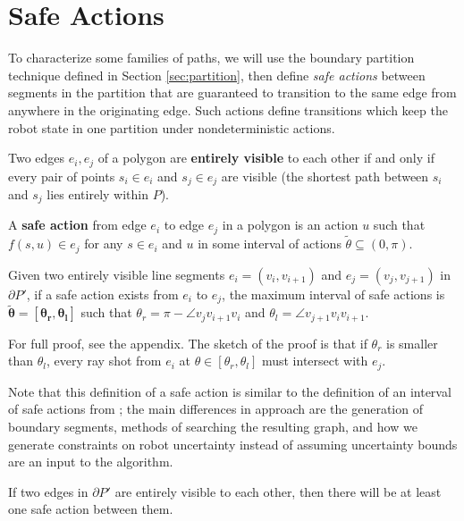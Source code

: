 \documentclass[]{styles/svproc}  %
\begin{document}
\section{Safe Actions} \label{sec:safe}

To characterize some families of paths, we will use the boundary
partition technique defined in Section \ref{sec:partition}, then define
\emph{safe actions} between segments in the partition that are
guaranteed to transition to the same edge from anywhere in the
originating edge. Such actions define transitions which keep the
robot state in one partition under nondeterministic actions.

\begin{definition}
Two edges $e_i,e_j$ of a polygon are \textbf{entirely visible} to each other if
and only if every pair of points $s_i \in e_i$ and $s_j \in e_j$ are visible (the
shortest path between $s_i$ and $s_j$ lies entirely within $P$).
\end{definition}

\begin{definition} \label{def:sa}
A \textbf{safe action} from edge $e_i$ to edge $e_j$ in a polygon is an 
action $u$ such
that $f(s,u) \in e_j$ for any $s \in e_i$ and $u$ in some interval of actions
$\tilde{\theta} \subseteq (0,\pi)$.
\end{definition}

\begin{proposition} \label{prop:saferange}
Given two entirely visible line segments $e_i = (v_i, v_{i+1})$ and $e_j =
(v_j, v_{j+1})$ in $\partial P'$, if a safe action
exists from $e_i$ to $e_j$, the maximum interval of safe actions is $\bm{\tilde{\theta} = [\theta_r, \theta_l]}$ such
that $\theta_r = \pi - \angle v_j v_{i+1} v_i$ and $\theta_l = \angle v_{j+1}
v_i v_{i+1}$.
\end{proposition}

For full proof, see the appendix. The sketch of the proof is that if $\theta_r$
is smaller than $\theta_l$, every ray shot from $e_i$ at $\theta \in [\theta_r,
\theta_l]$ must intersect with $e_j$.

Note that this definition of a safe action is similar to the definition of an interval of
safe actions from \cite{LewOKa13}; the main differences in approach are the
generation of boundary segments, methods of searching the resulting graph, and
how we generate constraints on robot uncertainty instead of assuming uncertainty
bounds are an input to the algorithm.

\begin{lemma}
If two edges in $\partial P'$ are entirely visible to each other, then there will be at least one safe
action between them.
\end{lemma}
\end{document}
